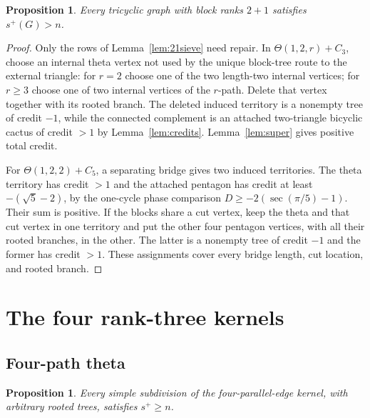 \documentclass[11pt]{article}
\newtheorem{proposition}[theorem]{Proposition}
\theoremstyle{remark}
\newcommand{\splus}{s^+}
\begin{document}
\begin{proposition}\label{prop:21}
Every tricyclic graph with block ranks $2+1$ satisfies $\splus(G)>n$.
\end{proposition}

\begin{proof}
Only the rows of Lemma~\ref{lem:21sieve} need repair.  In
$\Theta(1,2,r)+C_3$, choose an internal theta vertex not used by the unique
block-tree route to the external triangle: for $r=2$ choose one of the two
length-two internal vertices; for $r\geq3$ choose one of two internal vertices
of the $r$-path.  Delete that vertex together with its rooted branch.  The
deleted induced territory is a nonempty tree of credit $-1$, while the
connected complement is an attached two-triangle bicyclic cactus of credit
$>1$ by Lemma~\ref{lem:credits}.  Lemma~\ref{lem:super} gives positive total
credit.

For $\Theta(1,2,2)+C_5$, a separating bridge gives two induced territories.
The theta territory has credit $>1$ and the attached pentagon has credit at
least $-(\sqrt5-2)$, by the one-cycle phase comparison
$D\geq-2(\sec(\pi/5)-1)$.  Their sum is positive.  If the blocks share a cut
vertex, keep the theta and that cut vertex in one territory and put the other
four pentagon vertices, with all their rooted branches, in the other.  The
latter is a nonempty tree of credit $-1$ and the former has credit $>1$.
These assignments cover every bridge length, cut location, and rooted branch.
\end{proof}

\section{The four rank-three kernels}

\subsection{Four-path theta}

\begin{proposition}\label{prop:fourpath}
Every simple subdivision of the four-parallel-edge kernel, with arbitrary
rooted trees, satisfies $\splus\geq n$.
\end{proposition}
\end{document}
